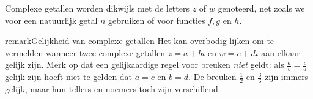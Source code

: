 \documentclass{ximera}
\begin{document}
    Complexe getallen worden dikwijls met de letters \(z\) of \(w\) genoteerd, net zoals we voor een natuurlijk getal \(n\) gebruiken of voor functies \(f, g \) en \(h\).

\begin{expandable}{remark}{Gelijkheid van complexe getallen}
    Het kan overbodig lijken om te vermelden wanneer twee complexe getallen \(z = a+bi\) en \(w = c+di\) aan elkaar gelijk zijn. Merk op dat een gelijkaardige regel voor breuken \textit{niet} geldt: als $\frac{a}{b} = \frac{c}{d}$ gelijk zijn hoeft niet te gelden dat \(a = c\) en \(b = d\). De breuken $\frac{1}{2}$ en $\frac{3}{6}$ zijn immers gelijk, maar hun tellers en noemers toch zijn verschillend. 
\end{expandable}

\end{document}
